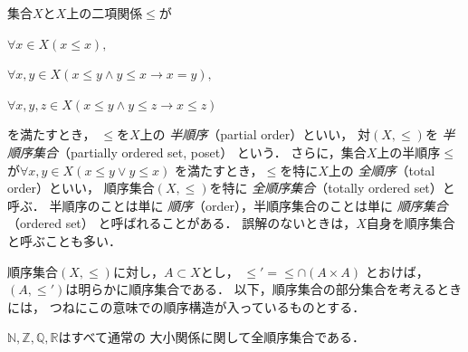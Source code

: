    \begin{axiom}[順序の公理]
     集合$X$と$X$上の二項関係$\leq$が
     \begin{description}
       \item[反射律] $\forall x \in X ( x \leq x ),$
       \item[反対称律] $\forall x,y \in X ( x \leq y \land y \leq x \to x=y),$
       \item[推移律] $\forall x, y,z \in X ( x \leq y \land y \leq z \to x \leq z)$
     \end{description}
     を満たすとき，
     $\leq$を$X$上の
     \emph{半順序}（partial order）といい，
     対$(X , \leq)$を
     \emph{半順序集合}（partially ordered set, poset）
     という．
     さらに，集合$X$上の半順序$\leq$が$\forall x ,y \in X (x \leq y \lor y \leq x)$
     を満たすとき，$\leq$を特に$X$上の
     \emph{全順序}（total order）といい，
     順序集合$(X , \leq)$を特に
     \emph{全順序集合}（totally ordered set）と呼ぶ．
     半順序のことは単に
     \emph{順序}（order），半順序集合のことは単に
     \emph{順序集合}（ordered set）
     と呼ばれることがある．
     誤解のないときは，$X$自身を順序集合と呼ぶことも多い．
   \end{axiom}

   順序集合$(X ,{\leq})$に対し，$A \subset X$とし，
   ${\leq'} = {\leq} \cap (A \times A)$
   とおけば，$(A, { \leq'})$は明らかに順序集合である．
   以下，順序集合の部分集合を考えるときには，
   つねにこの意味での順序構造が入っているものとする．

   \begin{ex} \label{ex:orderedset}
     $\mathbb{N} , \mathbb{Z} , \mathbb{Q} , \mathbb{R}$はすべて通常の
     大小関係に関して全順序集合である．
   \end{ex}


